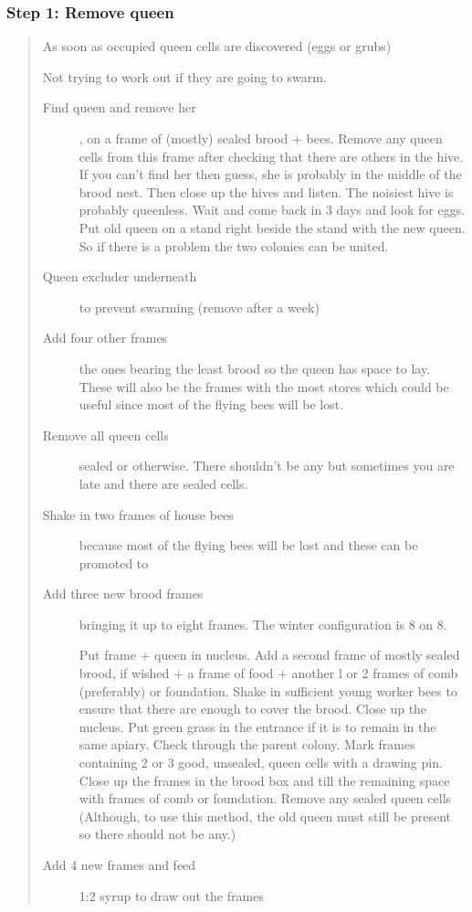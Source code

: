 \subsubsection*{Step 1: Remove queen}
\begin{quotation}
As soon as occupied queen cells are discovered (eggs or grubs)

Not trying to work out if they are going to swarm.

\begin{description}
  \item[Find queen and remove her], on a frame of (mostly) sealed brood + bees. Remove any queen cells from this frame after checking that there are others in the hive.
	If you can't find her  then guess, she is probably in the middle of the brood nest.
	Then close up the hives and listen.  The noisiest hive is probably queenless.
	Wait and come back in 3 days and look for eggs.
	Put old queen on a stand right beside the stand with the new queen.
  So if there is a problem the two colonies can be united.
  \item[Queen excluder underneath] to prevent swarming (remove after a week)
  \item[Add four other frames] the ones bearing the least brood so the queen has space to lay.
	These will also be the frames with the most stores which could be useful since most of the flying bees will be lost.
  \item[Remove all queen cells] sealed or otherwise.  There shouldn't be any but sometimes you are late and there are sealed cells.
  \item[Shake in two frames of house bees] because most of the flying bees will be lost and these can be promoted to 
  \item[Add three new brood frames] bringing it up to eight frames.  The winter configuration is 8 on 8.
  
  
Put frame + queen in nucleus.
Add a second frame of mostly sealed brood, if wished + a frame of food + another l or 2
frames of comb (preferably) or foundation.
Shake in sufficient young worker bees to ensure that there are enough to cover the brood.
Close up the nucleus. Put green grass in the entrance if it is to remain in the same apiary.
Check through the parent colony.  Mark frames containing 2 or 3 good, unsealed, queen cells with a drawing pin.
Close up the frames in the brood box and till the remaining space with frames of comb or foundation.
	Remove any sealed queen cells (Although, to use this method, the old queen must still be present so there should not be any.)
  \item[Add 4 new frames and feed] 1:2 syrup to draw out the frames
 \end{description}
\end{quotation}
 
